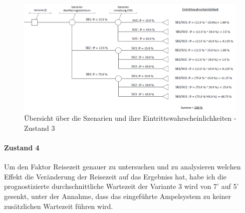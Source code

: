 \begin{figure}[h!]
	\centering
	\includegraphics[width=\textwidth]{figures/f-04-09-02-Entscheidungsbaum-Szenarien-Zustand-3}
	\caption[Szenarienübersicht - Zustand 3]{Übersicht über die Szenarien und ihre Eintrittswahrscheinlichkeiten - Zustand 3}
	\label{img:EntscheidunSzenarien-Z3}
\end{figure}

\paragraph{Zustand 4} Um den Faktor Reisezeit genauer zu untersuchen und zu analysieren welchen Effekt die Veränderung der Reisezeit auf das Ergebniss hat, habe ich die prognostizierte durchschnittliche Wartezeit der Variante 3 wird von 7' auf 5' gesenkt, unter der Annahme, dass das eingeführte Ampelsystem zu keiner zusätzlichen Wartezeit führen wird.



%

